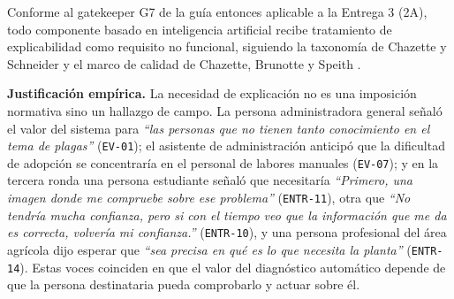 \documentclass[11pt,a4paper]{article}
\newcommand{\id}[1]{\texttt{\begingroup\hyphenpenalty=10000\relax#1\endgroup}}
\renewcommand{\id}[1]{\texttt{#1}}
\begin{document}
Conforme al gatekeeper G7 de la guía entonces aplicable a la Entrega 3 (2A), todo componente basado en inteligencia
artificial recibe tratamiento de explicabilidad como requisito no funcional, siguiendo la taxonomía
de Chazette y Schneider \cite{chazette2020} y el marco de calidad de Chazette, Brunotte y Speith
\cite{chazette2021,chazette2022}.

\textbf{Justificación empírica.} La necesidad de explicación no es una imposición normativa sino un
hallazgo de campo. La persona administradora general señaló el valor del sistema para
\emph{``las personas que no tienen tanto conocimiento en el tema de plagas''} (\id{EV-01}); el
asistente de administración anticipó que la dificultad de adopción se concentraría en el personal de
labores manuales (\id{EV-07}); y en la tercera ronda una persona estudiante señaló que necesitaría
\emph{``Primero, una imagen donde me compruebe sobre ese problema''} (\id{ENTR-11}), otra que
\emph{``No tendría mucha confianza, pero si con el tiempo veo que la información que me da es correcta,
volvería mi confianza.''} (\id{ENTR-10}), y una persona profesional del área agrícola dijo esperar que
\emph{``sea precisa en qué es lo que necesita la planta''} (\id{ENTR-14}). Estas voces coinciden en que
el valor del diagnóstico automático depende de que la persona destinataria pueda comprobarlo y actuar
sobre él.
\end{document}
